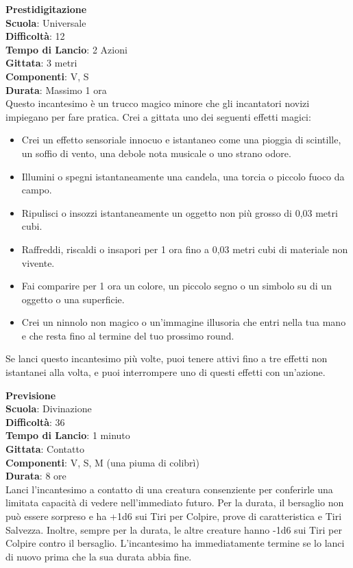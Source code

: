 \begin{multicols}{2}
\medskip\textbf{Prestidigitazione}\\
\textbf{Scuola}: Universale\\
\textbf{Difficoltà}: 12\\
\textbf{Tempo di Lancio}: 2 Azioni\\
\textbf{Gittata}: 3 metri\\
\textbf{Componenti}: V, S\\
\textbf{Durata}: Massimo 1 ora\\
Questo incantesimo è un trucco magico minore che gli incantatori novizi impiegano per fare pratica. Crei a gittata uno dei seguenti effetti magici:
\medskip
\begin{itemize}
\item
Crei un effetto sensoriale innocuo e istantaneo come una pioggia di scintille, un soffio di vento, una debole nota musicale o uno strano odore.
\item
Illumini o spegni istantaneamente una candela, una torcia o piccolo fuoco da campo.
\item
Ripulisci o insozzi istantaneamente un oggetto non più grosso di 0,03 metri cubi.
\item
Raffreddi, riscaldi o insapori per 1 ora fino a 0,03 metri cubi di materiale non vivente.
\item
Fai comparire per 1 ora un colore, un piccolo segno o un simbolo su di un oggetto o una superficie.
\item
Crei un ninnolo non magico o un'immagine illusoria che entri nella tua mano e che resta fino al termine del tuo prossimo round.
\end{itemize}
\medskip
Se lanci questo incantesimo più volte, puoi tenere attivi fino a tre effetti non istantanei alla volta, e puoi interrompere uno di questi effetti con un'azione.

\medskip\textbf{Previsione}\\
\textbf{Scuola}: Divinazione\\
\textbf{Difficoltà}: 36\\
\textbf{Tempo di Lancio}: 1 minuto\\
\textbf{Gittata}: Contatto\\
\textbf{Componenti}: V, S, M (una piuma di colibrì)\\
\textbf{Durata}: 8 ore\\
Lanci l'incantesimo a contatto di una creatura consenziente per conferirle una limitata capacità di vedere nell'immediato futuro. Per la durata, il bersaglio non può essere sorpreso e ha +1d6 sui Tiri per Colpire, prove di caratteristica e Tiri Salvezza. Inoltre, sempre per la durata, le altre creature hanno -1d6 sui Tiri per Colpire contro il bersaglio. L'incantesimo ha immediatamente termine se lo lanci di nuovo prima che la sua durata abbia fine.


\end{multicols}
